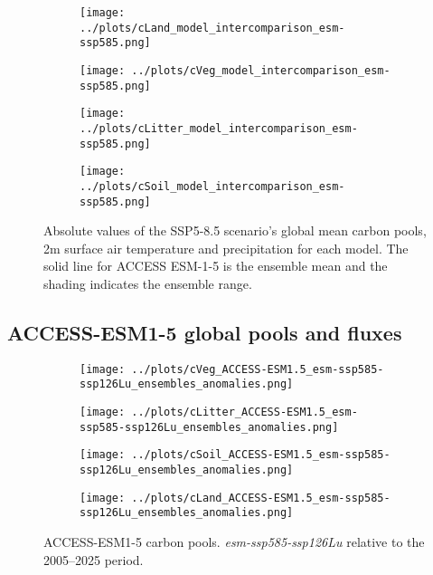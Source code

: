 \documentclass[]{article}
\begin{document}
\begin{figure}[H]
    \centering
    \begin{subfigure}[b]{0.45\linewidth}
        \texttt{[image: ../plots/cLand\_model\_intercomparison\_esm-ssp585.png]}
    \end{subfigure}
    \begin{subfigure}[b]{0.45\linewidth}
        \texttt{[image: ../plots/cVeg\_model\_intercomparison\_esm-ssp585.png]}
    \end{subfigure}
    \begin{subfigure}[b]{0.45\linewidth}
        \texttt{[image: ../plots/cLitter\_model\_intercomparison\_esm-ssp585.png]}
    \end{subfigure}
    \begin{subfigure}[b]{0.45\linewidth}
        \texttt{[image: ../plots/cSoil\_model\_intercomparison\_esm-ssp585.png]}
    \end{subfigure}
    \caption{Absolute values of the SSP5-8.5 scenario's global mean carbon pools, 2m surface air temperature and precipitation for each model. The solid line for ACCESS ESM-1-5 is the ensemble mean and the shading indicates the ensemble range.}
    \label{fig:models_absolute}
\end{figure}

\subsection{ACCESS-ESM1-5 global pools and fluxes}

\begin{figure}[H]
    \centering
    \begin{subfigure}[b]{0.4\linewidth}
        \texttt{[image: ../plots/cVeg\_ACCESS-ESM1.5\_esm-ssp585-ssp126Lu\_ensembles\_anomalies.png]}
    \end{subfigure}
    \begin{subfigure}[b]{0.4\linewidth}
        \texttt{[image: ../plots/cLitter\_ACCESS-ESM1.5\_esm-ssp585-ssp126Lu\_ensembles\_anomalies.png]}
    \end{subfigure}
    \begin{subfigure}[b]{0.4\linewidth}
        \texttt{[image: ../plots/cSoil\_ACCESS-ESM1.5\_esm-ssp585-ssp126Lu\_ensembles\_anomalies.png]}
    \end{subfigure}
\begin{subfigure}[b]{0.4\linewidth}
        \texttt{[image: ../plots/cLand\_ACCESS-ESM1.5\_esm-ssp585-ssp126Lu\_ensembles\_anomalies.png]}
    \end{subfigure}
    \caption{ACCESS-ESM1-5 carbon pools. \textit{esm-ssp585-ssp126Lu} relative to the 2005–2025 period.}
    \label{fig:access_cpools}
\end{figure}
\end{document}
